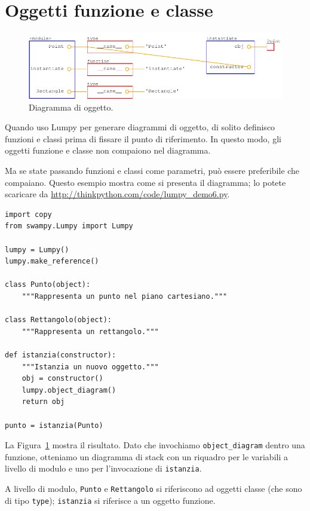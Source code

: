\documentclass[10pt]{book}
\begin{document}
\section{Oggetti funzione e classe}

\begin{figure}
\centerline
{\includegraphics[scale=0.7]{figs/lumpydemo6.pdf}}
\caption{Diagramma di oggetto.}
\label{fig.lumpy6}
\end{figure}

Quando uso Lumpy per generare diagrammi di oggetto, di solito definisco funzioni e classi prima di fissare il punto di riferimento. In questo modo, gli oggetti funzione e classe non compaiono nel diagramma.

Ma se state passando funzioni e classi come parametri, può essere preferibile che compaiano. Questo esempio mostra come si presenta il diagramma; lo potete scaricare da
\url{http://thinkpython.com/code/lumpy_demo6.py}.

\begin{verbatim}
import copy
from swampy.Lumpy import Lumpy

lumpy = Lumpy()
lumpy.make_reference()

class Punto(object):
    """Rappresenta un punto nel piano cartesiano."""

class Rettangolo(object):
    """Rappresenta un rettangolo."""

def istanzia(constructor):
    """Istanzia un nuovo oggetto."""
    obj = constructor()
    lumpy.object_diagram()
    return obj

punto = istanzia(Punto)
\end{verbatim}

La Figura~\ref{fig.lumpy6} mostra il risultato. Dato che invochiamo
\verb"object_diagram" dentro una funzione, otteniamo un diagramma di stack con un riquadro per le variabili a livello di modulo e uno per l'invocazione di
{\tt istanzia}.

A livello di modulo, {\tt Punto} e {\tt Rettangolo} si riferiscono ad oggetti classe (che sono di tipo {\tt type}); {\tt istanzia}
si riferisce a un oggetto funzione.
\end{document}
